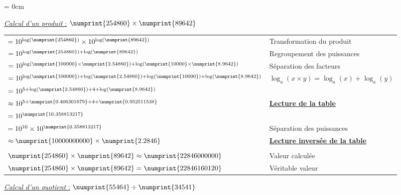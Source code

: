 \documentclass[a4paper]{article}
\begin{document}
{\parindent = 0cm

\underline{\textit{Calcul d'un produit} :} $\numprint{254860} \times \numprint{89642}$
\vspace{0.2cm}

\begin{large}
\begin{tabular}{l|l}

$= 10 ^{ \log ( \numprint{254860} ) } \times 10 ^ { \log ( \numprint{89642} ) }$ & \small Transformation du produit \\
$= 10 ^{ \log ( \numprint{254860} ) + \log ( \numprint{89642} ) }$ & \small Regroupement des puissances\\
$= 10 ^{ \log ( \numprint{100000} \times \numprint{2.54860}) + \log (\numprint{10000} \times \numprint{8.9642})}$ & \small Séparation des facteurs\\
$= 10 ^{ \log(\numprint{100000}) + \log ( \numprint{2.54860} ) + \log(\numprint{10000}) + \log (\numprint{8.9642}) }$ & \small $ \log_a ( x \times y ) = \log_a (x) + \log_a (y) $\\
$= 10 ^{ 5 + \log ( \numprint{2.54860} ) + 4 + \log ( \numprint{8.9642} ) }$ & \\
$\approx 10 ^{ 5 + \numprint{0.406301679} + 4 + \numprint{0.952511538} }$ & \small \underline{\textbf{Lecture de la table}}\\
$= 10 ^{ \numprint{10.358813217} }$ & \\
$= 10 ^{ 10 } \times 10^{ \numprint{0.358813217} }$ & \small Séparation des puissances \\
$\approx \numprint{10000000000} \times \numprint{2.2846}$ & \small \underline{\textbf{Lecture inversée de la table}} \\
\\
$\numprint{254860} \times \numprint{89642} \approx \numprint{22846000000} $ & \small Valeur calculée\\
$\numprint{254860} \times \numprint{89642} = \numprint{22846160120} $ & \small Véritable valeur \\

\end{tabular}
\end{large}

\vfill

\underline{\textit{Calcul d'un quotient} :} $\numprint{55464} \div \numprint{34541}$
\vspace{0.2cm}

\begin{large}
\begin{tabular}{l|l}


\end{tabular}
\end{large}}
\end{document}
